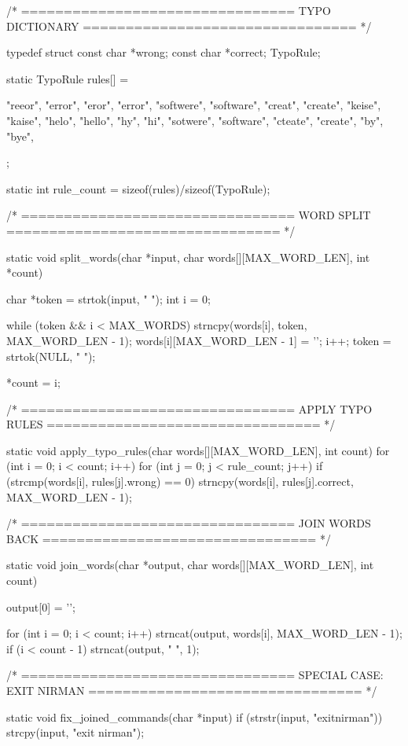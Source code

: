 \documentclass{article}
\begin{document}
/* ================================
   TYPO DICTIONARY
================================ */

typedef struct {
    const char *wrong;
    const char *correct;
} TypoRule;

static TypoRule rules[] = {
    {"reeor", "error"},
    {"eror", "error"},
    {"softwere", "software"},
    {"creat", "create"},
    {"keise", "kaise"},
    {"helo", "hello"},
    {"hy", "hi"},
    {"sotwere", "software"},
    {"cteate", "create"},
    {"by", "bye"},

};

static int rule_count = sizeof(rules)/sizeof(TypoRule);

/* ================================
   WORD SPLIT
================================ */

static void split_words(char *input, char words[][MAX_WORD_LEN], int *count)
{
    char *token = strtok(input, " ");
    int i = 0;

    while (token && i < MAX_WORDS)
    {
        strncpy(words[i], token, MAX_WORD_LEN - 1);
        words[i][MAX_WORD_LEN - 1] = '\0';
        i++;
        token = strtok(NULL, " ");
    }

    *count = i;
}

/* ================================
   APPLY TYPO RULES
================================ */

static void apply_typo_rules(char words[][MAX_WORD_LEN], int count)
{
    for (int i = 0; i < count; i++)
    {
        for (int j = 0; j < rule_count; j++)
        {
            if (strcmp(words[i], rules[j].wrong) == 0)
            {
                strncpy(words[i], rules[j].correct, MAX_WORD_LEN - 1);
            }
        }
    }
}

/* ================================
   JOIN WORDS BACK
================================ */

static void join_words(char *output, char words[][MAX_WORD_LEN], int count)
{
    output[0] = '\0';

    for (int i = 0; i < count; i++)
    {
        strncat(output, words[i], MAX_WORD_LEN - 1);
        if (i < count - 1)
            strncat(output, " ", 1);
    }
}

/* ================================
   SPECIAL CASE: EXIT NIRMAN
================================ */

static void fix_joined_commands(char *input)
{
    if (strstr(input, "exitnirman"))
    {
        strcpy(input, "exit nirman");
    }
}
\end{document}
